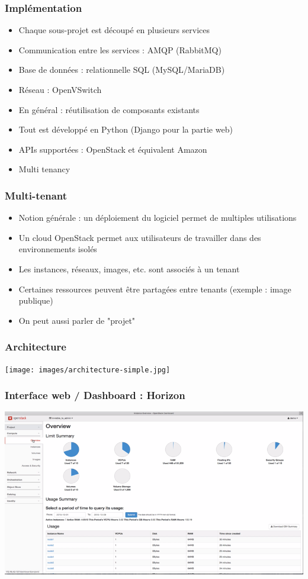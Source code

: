   \begin{frame}
    \frametitle{Implémentation}
    \begin{itemize}
      \item Chaque sous-projet est découpé en plusieurs services\pause
      \item Communication entre les services : AMQP (RabbitMQ)\pause
      \item Base de données : relationnelle SQL (MySQL/MariaDB)\pause
      \item Réseau : OpenVSwitch\pause
      \item En général : réutilisation de composants existants\pause
      \item Tout est développé en Python (Django pour la partie web)\pause
      \item APIs supportées : OpenStack et équivalent Amazon\pause
      \item Multi tenancy
    \end{itemize}
  \end{frame}

  \begin{frame}
    \frametitle{Multi-tenant}
    \begin{itemize}
      \item Notion générale : un déploiement du logiciel permet de multiples utilisations
      \item Un cloud OpenStack permet aux utilisateurs de travailler dans des environnements isolés
      \item Les instances, réseaux, images, etc. sont associés à un tenant
      \item Certaines ressources peuvent être partagées entre tenants (exemple : image publique)
      \item On peut aussi parler de "projet"
    \end{itemize}
  \end{frame}

  \begin{frame}
    \frametitle{Architecture}
    \begin{center}
      \texttt{[image: images/architecture-simple.jpg]}
    \end{center}
  \end{frame}

  \begin{frame}
    \frametitle{Interface web / Dashboard : Horizon}
    \includegraphics[width=\textwidth]{images/horizon.png}
  \end{frame}

